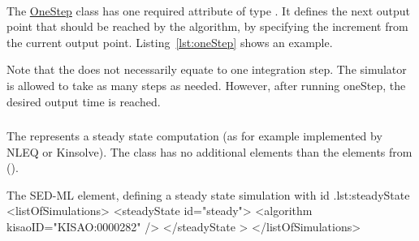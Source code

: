 \paragraph*{}
\label{sec:step}
The \hyperref[class:oneStep]{OneStep} class has one required attribute  of type . It defines the next output point that should be reached by the algorithm, by specifying the increment from the current output point. Listing~\ref{lst:oneStep} shows an example. 

Note that the  does not necessarily equate to one integration step. The simulator is allowed to take as many steps as needed. However, after running oneStep, the desired output time is reached.


\subsubsection{}
\label{class:steadyState}
The  represents a steady state computation (as for example implemented by NLEQ or Kinsolve). The  class has no additional elements than the elements from \Simulation ().


\begin{myXmlLst}{The SED-ML  element, defining a steady state simulation with id .}{lst:steadyState}
<listOfSimulations>
	<steadyState id="steady"> 
		<algorithm kisaoID="KISAO:0000282" />
	</steadyState > 
</listOfSimulations>
\end{myXmlLst}



